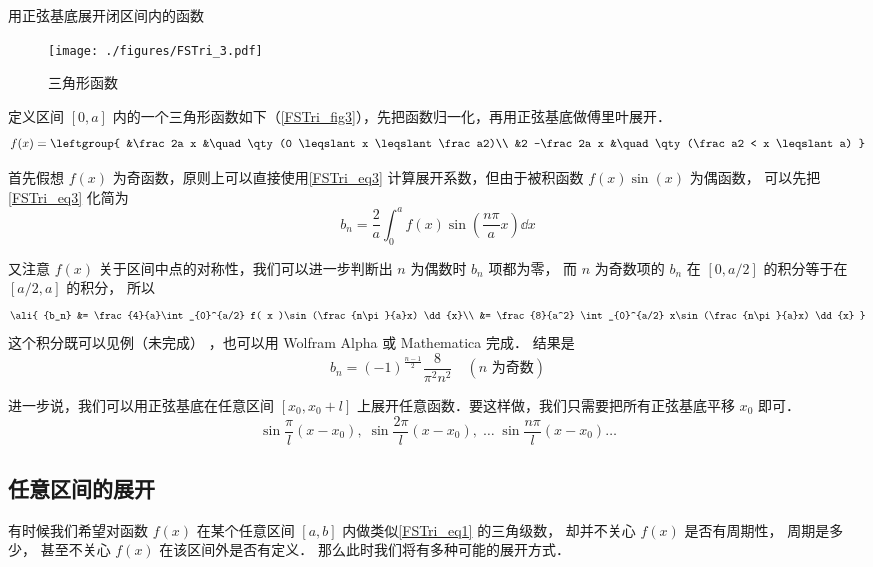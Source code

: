 \begin{example}{用正弦基底展开闭区间内的函数}

\begin{figure}[ht]
\centering
\texttt{[image: ./figures/FSTri\_3.pdf]}
\caption{三角形函数} \label{FSTri_fig3}
\end{figure}

定义区间 $[0,a]$ 内的一个三角形函数如下（\autoref{FSTri_fig3}），先把函数归一化，再用正弦基底做傅里叶展开．
\begin{equation}
f(x) = \leftgroup{
&\frac2a x &\quad \qty(0 \leqslant x \leqslant \frac a2)\\
&2 -\frac2a x &\quad \qty(\frac a2 < x \leqslant a)
}\end{equation}

首先假想 $f(x)$ 为奇函数，原则上可以直接使用\autoref{FSTri_eq3} 计算展开系数，但由于被积函数 $f(x)\sin(x)$ 为偶函数， 可以先把\autoref{FSTri_eq3} 化简为%
\begin{equation}
{b_n} = \frac{2}{a}\int_{0}^a f( x )\sin (\frac{n\pi}{a}x) \dd{x}
\end{equation}

又注意 $f(x)$ 关于区间中点的对称性，我们可以进一步判断出 $n$ 为偶数时 $b_n$ 项都为零， 而 $n$ 为奇数项的 $b_n$ 在 $[0, a/2]$ 的积分等于在 $[a/2, a]$ 的积分， 所以
\begin{equation}
\ali{
{b_n} &= \frac{4}{a}\int_{0}^{a/2} f( x )\sin (\frac{n\pi}{a}x) \dd{x}\\
&= \frac{8}{a^2} \int_{0}^{a/2} x\sin (\frac{n\pi}{a}x) \dd{x}
}\end{equation}
这个积分既可以见例（未完成）
，也可以用 Wolfram Alpha 或 Mathematica 完成．%
结果是
\begin{equation}
b_n = (-1)^{\frac{n-1}{2}} \frac{8}{\pi^2 n^2} \quad (\text{$n$ 为奇数})
\end{equation}
\end{example}
进一步说，我们可以用正弦基底在任意区间 $[x_0,x_0+l]$ 上展开任意函数．要这样做，我们只需要把所有正弦基底平移 $x_0$ 即可．
\begin{equation}
\sin\frac{\pi}{l} (x-x_0),\;   \sin\frac{2\pi}{l} (x-x_0),\;    \dots\;\sin\frac{n\pi}{l} (x-x_0) \dots
\end{equation}

\subsection{任意区间的展开}\label{FSTri_sub2}
有时候我们希望对函数 $f(x)$ 在某个任意区间 $[a, b]$ 内做类似\autoref{FSTri_eq1} 的三角级数， 却并不关心 $f(x)$ 是否有周期性， 周期是多少， 甚至不关心 $f(x)$ 在该区间外是否有定义． 那么此时我们将有多种可能的展开方式．

